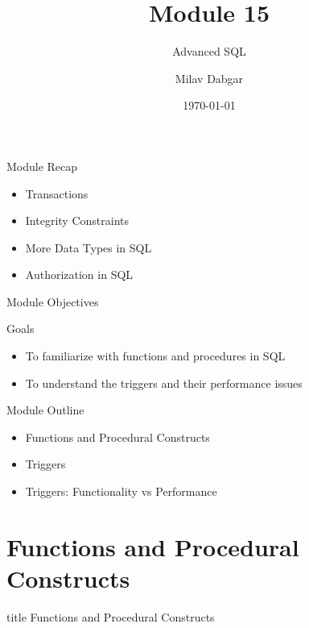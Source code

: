 \documentclass[aspectratio=169, xcolor=dvipsnames]{beamer}
\title{Module 15}
\subtitle{Advanced SQL}
\author{Milav Dabgar}
\institute{www.milav.in}
\date{\today}
\begin{document}
\begin{frame}
    \titlepage
\end{frame}

\begin{frame}{Module Recap}
    \begin{itemize}[<+->]
        \item Transactions
        \item Integrity Constraints
        \item More Data Types in SQL
        \item Authorization in SQL
    \end{itemize}
\end{frame}

\begin{frame}{Module Objectives}
    \begin{block}{Goals}
        \begin{itemize}[<+->]
            \item To familiarize with functions and procedures in SQL
            \item To understand the triggers and their performance issues
        \end{itemize}
    \end{block}
\end{frame}

\begin{frame}{Module Outline}
    \begin{itemize}[<+->]
        \item Functions and Procedural Constructs
        \item Triggers
        \item Triggers: Functionality vs Performance
    \end{itemize}
\end{frame}

\section{Functions and Procedural Constructs}
\begin{frame}
  \vfill
  \centering
  \begin{beamercolorbox}[sep=8pt,center,shadow=true,rounded=true]{title}
    Functions and Procedural Constructs\par%
  \end{beamercolorbox}
  \vfill
\end{frame}
\end{document}
